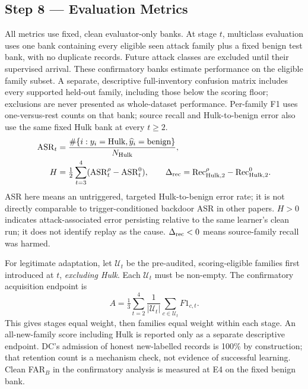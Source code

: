 \documentclass[10pt,a4paper]{article}
\begin{document}
\subsection{Step 8 --- Evaluation Metrics}
All metrics use fixed, clean evaluator-only banks. At stage $t$, multiclass evaluation uses one bank containing every eligible seen attack family plus a fixed benign test bank, with no duplicate records. Future attack classes are excluded until their supervised arrival. These confirmatory banks estimate performance on the eligible family subset. A separate, descriptive full-inventory confusion matrix includes every supported held-out family, including those below the scoring floor; exclusions are never presented as whole-dataset performance. Per-family F1 uses one-versus-rest counts on that bank; source recall and Hulk-to-benign error also use the same fixed Hulk bank at every $t\ge2$.
\begin{equation}
\begin{aligned}
\mathrm{ASR}_t&=\frac{\#\{i:y_i=\text{Hulk},\widehat y_i=\text{benign}\}}{N_{\rm Hulk}},\\
H&=\tfrac12\sum_{t=3}^{4}(\mathrm{ASR}^{\rho}_t-\mathrm{ASR}^{0}_t),\qquad
\Delta_{\rm rec}=\mathrm{Rec}^{\rho}_{{\rm Hulk},2}-\mathrm{Rec}^{0}_{{\rm Hulk},2}.
\end{aligned}
\label{eq:asr}
\end{equation}
ASR here means an untriggered, targeted Hulk-to-benign error rate; it is not directly comparable to trigger-conditioned backdoor ASR in other papers. $H>0$ indicates attack-associated error persisting relative to the same learner's clean run; it does not identify replay as the cause. $\Delta_{\rm rec}<0$ means source-family recall was harmed.

For legitimate adaptation, let $\mathcal U_t$ be the pre-audited, scoring-eligible families first introduced at $t$, \emph{excluding Hulk}. Each $\mathcal U_t$ must be non-empty. The confirmatory acquisition endpoint is
\begin{equation}
A=\tfrac13\sum_{t=2}^{4}\frac{1}{|\mathcal U_t|}\sum_{c\in\mathcal U_t}F1_{c,t}.
\label{eq:acquisition}
\end{equation}
This gives stages equal weight, then families equal weight within each stage. An all-new-family score including Hulk is reported only as a separate descriptive endpoint. DC's admission of honest new-labelled records is 100\% by construction; that retention count is a mechanism check, not evidence of successful learning. Clean FAR$_B$ in the confirmatory analysis is measured at E4 on the fixed benign bank.
\end{document}
